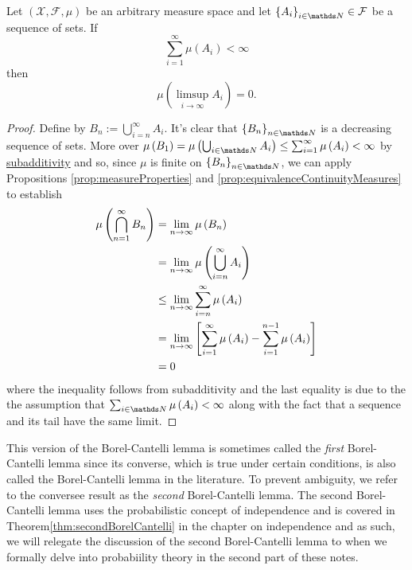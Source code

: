\begin{thm}
\label{thm:borelCantelli}Let $\left(\mathcal{X},\mathcal{F},\mu\right)$
be an arbitrary measure space and let $\left\{ A_{i}\right\} _{i\in\N}\in\mathcal{F}$
be a sequence of sets. If
\[
\sum_{i=1}^{\infty}\mu\left(A_{i}\right)<\infty
\]
then
\[
\mu\left(\limsup_{i\to\infty}A_{i}\right)=0.
\]
\end{thm}

\begin{proof}
Define by $B_{n}:=\bigcup_{i=n}^{\infty}A_{i}$. It's clear that $\left\{ B_{n}\right\} _{n\in\N}$
is a decreasing sequence of sets. More over $\mu\left(B_{1}\right)=\mu\left(\bigcup_{i\in\N}A_{i}\right)\leq\sum_{i=1}^{\infty}\mu\left(A_{i}\right)<\infty$
by \hyperref[cor:countableSubadditivity]{subadditivity} and so, since
$\mu$ is finite on $\left\{ B_{n}\right\} _{n\in\N}$, we can apply
Propositions \ref{prop:measureProperties} and \ref{prop:equivalenceContinuityMeasures}
to establish
\begin{align*}
\mu\left(\bigcap_{n=1}^{\infty}B_{n}\right) & =\lim_{n\to\infty}\mu\left(B_{n}\right)\\
 & =\lim_{n\to\infty}\text{\ensuremath{\mu\left(\bigcup_{i=n}^{\infty}A_{i}\right)}}\\
 & \leq\lim_{n\to\infty}\sum_{i=n}^{\infty}\mu\left(A_{i}\right)\\
 & =\lim_{n\to\infty}\left[\sum_{i=1}^{\infty}\mu\left(A_{i}\right)-\sum_{i=1}^{n-1}\mu\left(A_{i}\right)\right]\\
 & =0
\end{align*}
where the inequality follows from subadditivity and the last equality
is due to the the assumption that $\sum_{i\in\N}\mu\left(A_{i}\right)<\infty$
along with the fact that a sequence and its tail have the same limit.
\end{proof}
\begin{rem*}
This version of the Borel-Cantelli lemma is sometimes called the \emph{first
}Borel-Cantelli lemma since its converse, which is true under certain
conditions, is also called the Borel-Cantelli lemma in the literature.
To prevent ambiguity, we refer to the conversee result as the \emph{second
}Borel-Cantelli lemma. The second Borel-Cantelli lemma uses the probabilistic
concept of independence and is covered in Theorem\ref{thm:secondBorelCantelli}
in the chapter on independence and as such, we will relegate the discussion
of the second Borel-Cantelli lemma to when we formally delve into
probabiility theory in the second part of these notes.
\end{rem*}
